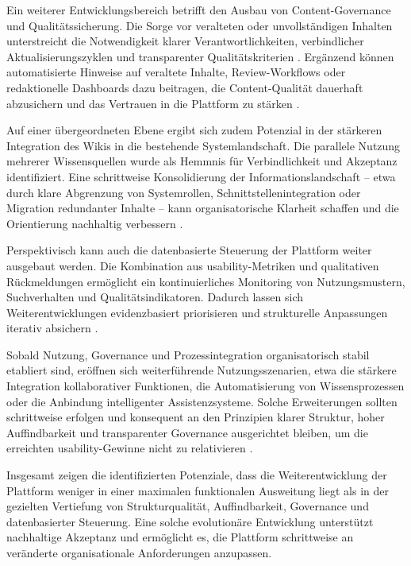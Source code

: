 Ein weiterer Entwicklungsbereich betrifft den Ausbau von Content-Governance und Qualitätssicherung. Die Sorge vor veralteten oder unvollständigen Inhalten unterstreicht die Notwendigkeit klarer Verantwortlichkeiten, verbindlicher Aktualisierungszyklen und transparenter Qualitätskriterien \cite{115:NNGContentManagement,116:StepTwoGuidance}. Ergänzend können automatisierte Hinweise auf veraltete Inhalte, Review-Workflows oder redaktionelle Dashboards dazu beitragen, die Content-Qualität dauerhaft abzusichern und das Vertrauen in die Plattform zu stärken \cite{309:NNGContentGovernance}.

Auf einer übergeordneten Ebene ergibt sich zudem Potenzial in der stärkeren Integration des Wikis in die bestehende Systemlandschaft. Die parallele Nutzung mehrerer Wissensquellen wurde als Hemmnis für Verbindlichkeit und Akzeptanz identifiziert. Eine schrittweise Konsolidierung der Informationslandschaft -- etwa durch klare Abgrenzung von Systemrollen, Schnittstellenintegration oder Migration redundanter Inhalte -- kann organisatorische Klarheit schaffen und die Orientierung nachhaltig verbessern \cite{306:DWGDigitalWorkplace,307:DWGFindability}.

Perspektivisch kann auch die datenbasierte Steuerung der Plattform weiter ausgebaut werden. Die Kombination aus \Gls{usability}-Metriken und qualitativen Rückmeldungen ermöglicht ein kontinuierliches Monitoring von Nutzungsmustern, Suchverhalten und Qualitätsindikatoren. Dadurch lassen sich Weiterentwicklungen evidenzbasiert priorisieren und strukturelle Anpassungen iterativ absichern \cite{124:Triangulation2023,121:NNGUsabilityTesting}.

\newpage

Sobald Nutzung, Governance und Prozessintegration organisatorisch stabil etabliert sind, eröffnen sich weiterführende Nutzungsszenarien, etwa die stärkere Integration kollaborativer Funktionen, die Automatisierung von Wissensprozessen oder die Anbindung intelligenter Assistenzsysteme. Solche Erweiterungen sollten schrittweise erfolgen und konsequent an den Prinzipien klarer Struktur, hoher Auffindbarkeit und transparenter Governance ausgerichtet bleiben, um die erreichten \Gls{usability}-Gewinne nicht zu relativieren \cite{403:Westerman2014,300:FraunhoferIESE2018}.

Insgesamt zeigen die identifizierten Potenziale, dass die Weiterentwicklung der Plattform weniger in einer maximalen funktionalen Ausweitung liegt als in der gezielten Vertiefung von Strukturqualität, Auffindbarkeit, Governance und datenbasierter Steuerung. Eine solche evolutionäre Entwicklung unterstützt nachhaltige Akzeptanz und ermöglicht es, die Plattform schrittweise an veränderte organisationale Anforderungen anzupassen.
